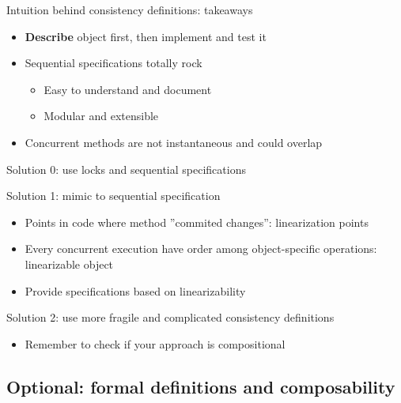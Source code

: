 \begin{frame}[fragile]{Intuition behind consistency definitions: takeaways}

\begin{itemize}
  \item \textbf{Describe} object first, then implement and test it
  \item Sequential specifications totally rock
  \begin{itemize}
    \item Easy to understand and document
    \item Modular and extensible
  \end{itemize}

  \item Concurrent methods are not instantaneous and could overlap
\end{itemize}

\pause

Solution 0: use locks and sequential specifications

\pause

Solution 1: mimic to sequential specification
\begin{itemize}
  \item Points in code where method ''commited changes'': linearization points
  \item Every concurrent execution have order among object-specific operations: linearizable object
  \item Provide specifications based on linearizability
\end{itemize}

\pause

Solution 2: use more fragile and complicated consistency definitions

\begin{itemize}
  \pause \item Remember to check if your approach is compositional
\end{itemize}

\end{frame}

\subsection{Optional: formal definitions and composability}
\showTOCSub

